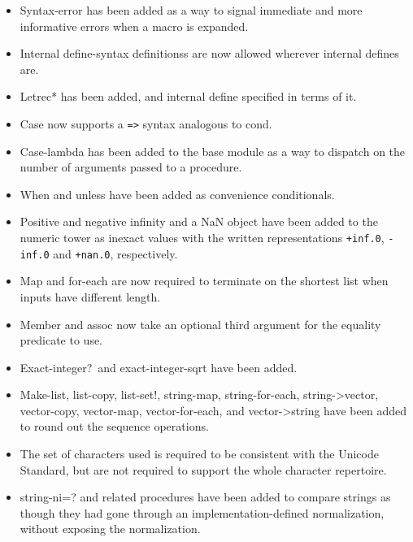 \begin{itemize}
\item {\cf Syntax-error} has been added as a way to signal immediate
and more informative errors when a macro is expanded.

\item Internal {\cf define-syntax} definitionss are now allowed wherever
internal {\cf define}s are.

\item {\cf Letrec*} has been added, and internal define specified in
terms of it.

\item {\cf Case} now supports a {\tt =>} syntax analogous to {\cf cond}.

\item {\cf Case-lambda} has been added to the base module as a way to
dispatch on the number of arguments passed to a procedure.

\item {\cf When} and {\cf unless} have been added as convenience
conditionals.

\item Positive and negative infinity and a NaN object have been added
to the numeric tower as inexact values with the written
representations {\tt +inf.0}, {\tt -inf.0} and {\tt +nan.0},
respectively.

\item {\cf Map} and {\cf for-each} are now required to terminate on
the shortest list when inputs have different length.

\item {\cf Member} and {\cf assoc} now take an optional third argument
for the equality predicate to use.

\item {\cf Exact-integer?}\  and {\cf exact-integer-sqrt} have been added.

\item {\cf Make-list}, {\cf list-copy}, {\cf list-set!}, {\cf
string-map}, {\cf string-for-each}, {\cf string->vector}, {\cf
vector-copy}, {\cf vector-map}, {\cf vector-for-each}, and {\cf
vector->string} have been added to round out the sequence operations.

\item The set of characters used is required to be consistent with the
Unicode Standard, 
but are not required to support the whole character repertoire.

\item {\cf string-ni=?} and related procedures have been added to
compare strings as though they had gone through an
implementation-defined normalization, without exposing the
normalization.


\end{itemize}
